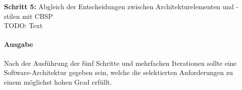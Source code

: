 \textbf{Schritt 5:} Abgleich der Entscheidungen zwischen Architekturelementen und -stilen mit CBSP \\
TODO: Text \\


\paragraph{Ausgabe}

Nach der Ausführung der fünf Schritte und mehrfachen Iterationen sollte eine Software-Architektur gegeben sein, welche die selektierten Anforderungen zu einem möglichst hohen Grad erfüllt.






